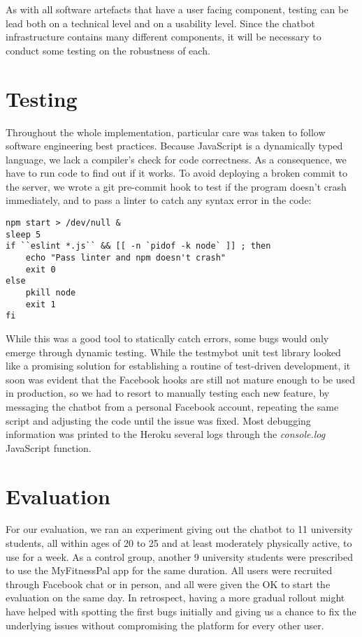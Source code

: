 As with all software artefacts that have a user facing component, testing can be lead both on a technical level and on a usability level. Since the chatbot infrastructure contains many different components, it will be necessary to conduct some testing on the robustness of each.
\section{Testing}
Throughout the whole implementation, particular care was taken to follow software engineering best practices. Because JavaScript is a dynamically typed language, we lack a compiler's check for code correctness. As a consequence, we have to run code to find out if it works. To avoid deploying a broken commit to the server, we wrote a git pre-commit hook to test if the program doesn't crash immediately, and to pass a linter to catch any syntax error in the code:
\begin{lstlisting}
npm start > /dev/null &
sleep 5
if ``eslint *.js`` && [[ -n `pidof -k node` ]] ; then
    echo "Pass linter and npm doesn't crash"
    exit 0
else
    pkill node
    exit 1
fi
\end{lstlisting}
While this was a good tool to statically catch errors, some bugs would only emerge through dynamic testing. While the testmybot unit test library looked like a promising solution for establishing a routine of test-driven development, it soon was evident that the Facebook hooks are still not mature enough to be used in production, so we had to resort to manually testing each new feature, by messaging the chatbot from a personal Facebook account, repeating the same script and adjusting the code until the issue was fixed. Most debugging information was printed to the Heroku several logs through the \textit{console.log} JavaScript function.
\section{Evaluation}
For our evaluation, we ran an experiment giving out the chatbot to 11 university students, all within ages of 20 to 25 and at least moderately physically active, to use for a week. As a control group, another 9 university students were prescribed to use the MyFitnessPal app for the same duration. All users were recruited through Facebook chat or in person, and all were given the OK to start the evaluation on the same day. In retrospect, having a more gradual rollout might have helped with spotting the first bugs initially and giving us a chance to fix the underlying issues without compromising the platform for every other user.
